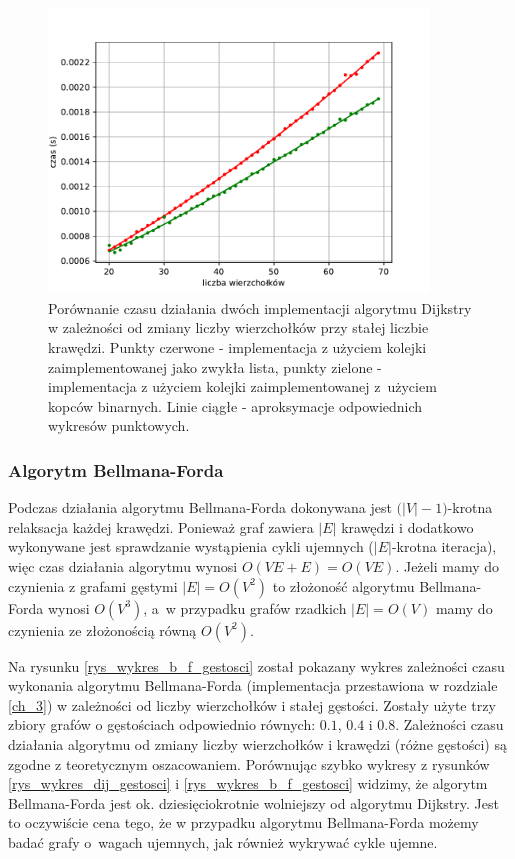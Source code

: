 \documentclass[12pt,a4paper]{book}
\theoremstyle{definition}
\numberwithin{equation}{chapter}
\begin{document}
\begin{figure}[H]
\centering
\includegraphics[width=0.9\textwidth]{images/Wykres_Dijkstra_naiwny_kolejka.pdf}
\caption{Porównanie czasu działania dwóch implementacji algorytmu Dijkstry w zależności od zmiany liczby wierzchołków przy stałej liczbie krawędzi. Punkty czerwone - implementacja z użyciem kolejki zaimplementowanej jako zwykła lista, punkty zielone - implementacja z użyciem kolejki zaimplementowanej z~użyciem kopców binarnych. Linie ciągłe -  aproksymacje odpowiednich wykresów punktowych.}
\label{rys_wykres_dij_naive}
\end{figure}



\subsubsection*{Algorytm Bellmana-Forda}
Podczas działania algorytmu Bellmana-Forda dokonywana jest $\big(|V| - 1\big)$-krotna relaksacja każdej krawędzi. Ponieważ graf zawiera $|E|$ krawędzi i dodatkowo wykonywane jest sprawdzanie wystąpienia cykli ujemnych ($|E|$-krotna iteracja), więc czas działania algorytmu wynosi $O(VE+E)= O(VE)$. Jeżeli mamy do czynienia z grafami gęstymi $|E|=O(V^2)$ to złożoność algorytmu Bellmana-Forda wynosi $O(V^3)$, a~w przypadku grafów rzadkich  $|E|=O(V)$ mamy do czynienia ze złożonością równą $O(V^2)$.

Na rysunku \ref{rys_wykres_b_f_gestosci} został pokazany wykres zależności czasu wykonania algorytmu Bellmana-Forda (implementacja przestawiona w rozdziale \ref{ch_3}) w zależności od liczby wierzchołków i stałej gęstości. Zostały użyte trzy zbiory grafów o gęstościach odpowiednio równych: $0.1$, $0.4$ i $0.8$. Zależności czasu działania algorytmu od zmiany liczby wierzchołków i krawędzi (różne gęstości) są zgodne z teoretycznym oszacowaniem. Porównując szybko wykresy z rysunków \ref{rys_wykres_dij_gestosci} i \ref{rys_wykres_b_f_gestosci} widzimy, że algorytm Bellmana-Forda jest ok. dziesięciokrotnie wolniejszy od algorytmu Dijkstry. Jest to oczywiście cena tego, że w przypadku algorytmu Bellmana-Forda możemy badać grafy o~wagach ujemnych, jak również wykrywać cykle ujemne.
\end{document}
